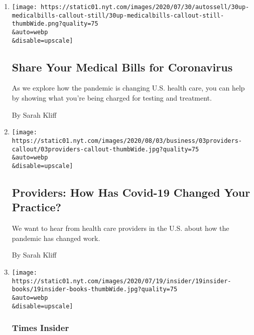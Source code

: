 \begin{enumerate}
\def\labelenumi{\arabic{enumi}.}
\item
  \href{/2020/08/03/reader-center/coronavirus-medical-bills.html}{}

  \texttt{[image: https://static01.nyt.com/images/2020/07/30/autossell/30up-medicalbills-callout-still/30up-medicalbills-callout-still-thumbWide.png?quality=75\\\&auto=webp\\\&disable=upscale]}

  \hypertarget{share-your-medical-bills-for-coronavirus}{%
  \subsection{Share Your Medical Bills for
  Coronavirus}\label{share-your-medical-bills-for-coronavirus}}

  As we explore how the pandemic is changing U.S. health care, you can
  help by showing what you're being charged for testing and treatment.

  By Sarah Kliff
\item
  \href{/2020/08/03/reader-center/healthcare-workers-coronavirus-care.html}{}

  \texttt{[image: https://static01.nyt.com/images/2020/08/03/business/03providers-callout/03providers-callout-thumbWide.jpg?quality=75\\\&auto=webp\\\&disable=upscale]}

  \hypertarget{providers-how-has-covid-19-changed-your-practice}{%
  \subsection{Providers: How Has Covid-19 Changed Your
  Practice?}\label{providers-how-has-covid-19-changed-your-practice}}

  We want to hear from health care providers in the U.S. about how the
  pandemic has changed work.

  By Sarah Kliff
\item
  \href{/2020/07/19/insider/times-book-review-remote.html}{}

  \texttt{[image: https://static01.nyt.com/images/2020/07/19/insider/19insider-books/19insider-books-thumbWide.jpg?quality=75\\\&auto=webp\\\&disable=upscale]}

  \hypertarget{times-insider-4}{%
  \subsubsection{Times Insider}\label{times-insider-4}}


\end{enumerate}
